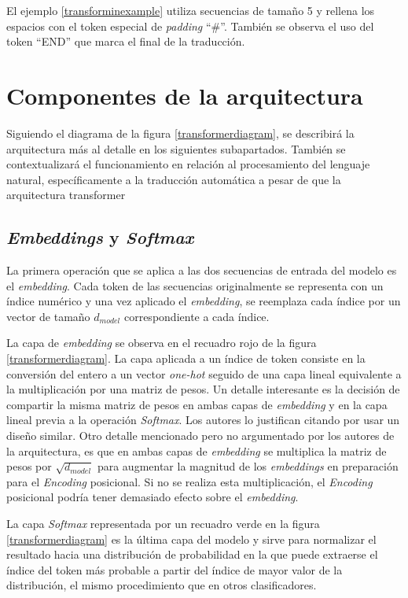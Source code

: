 El ejemplo \ref{transforminexample} utiliza secuencias de tamaño 5 y rellena los espacios con el token especial de \textit{padding} ``\#''. También se observa el uso del token ``END'' que marca el final de la traducción.

\section{Componentes de la arquitectura}
Siguiendo el diagrama de la figura \ref{transformerdiagram}, se describirá la arquitectura más al detalle en los siguientes subapartados. También se contextualizará el funcionamiento en relación al procesamiento del lenguaje natural, específicamente a la traducción automática a pesar de que la arquitectura transformer 

\subsection{\textit{Embeddings} y \textit{Softmax}}
La primera operación que se aplica a las dos secuencias de entrada del modelo es el \textit{embedding}. Cada token de las secuencias originalmente se representa con un índice numérico y una vez aplicado el \textit{embedding}, se reemplaza cada índice por un vector de tamaño $d_{model}$ correspondiente a cada índice.

La capa de \textit{embedding} se observa en el recuadro rojo de la figura \ref{transformerdiagram}. La capa aplicada a un índice de token consiste en la conversión del entero a un vector \textit{one-hot} seguido de una capa lineal equivalente a la multiplicación por una matriz de pesos. Un detalle interesante es la decisión de compartir la misma matriz de pesos en ambas capas de \textit{embedding} y en la capa lineal previa a la operación \textit{Softmax}. Los autores lo justifican citando \cite{Press2016Aug} por usar un diseño similar. Otro detalle mencionado pero no argumentado por los autores de la arquitectura, es que en ambas capas de \textit{embedding} se multiplica la matriz de pesos por $\sqrt{d_{model}}$ para augmentar la magnitud de los \textit{embeddings} en preparación para el \textit{Encoding} posicional. Si no se realiza esta multiplicación, el \textit{Encoding} posicional podría tener demasiado efecto sobre el \textit{embedding}.

La capa \textit{Softmax} representada por un recuadro verde en la figura \ref{transformerdiagram} es la última capa del modelo y sirve para normalizar el resultado hacia una distribución de probabilidad en la que puede extraerse el índice del token más probable a partir del índice de mayor valor de la distribución, el mismo procedimiento que en otros clasificadores.

